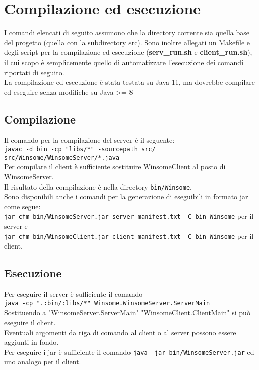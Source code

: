\section{Compilazione ed esecuzione}
I comandi elencati di seguito assumono che la directory corrente sia quella base del progetto
(quella con la subdirectory src). Sono inoltre allegati un Makefile e degli script per la compilazione ed esecuzione (\textbf{serv\_run.sh} e \textbf{client\_run.sh}), il cui scopo è semplicemente quello di automatizzare l'esecuzione dei comandi riportati di seguito.\\
La compilazione ed esecuzione è stata testata su Java 11, ma dovrebbe compilare ed eseguire senza modifiche su Java >= 8

\subsection{Compilazione}
Il comando per la compilazione del server è il seguente:\\
\verb|javac -d bin -cp "libs/*" -sourcepath src/ src/Winsome/WinsomeServer/*.java|\\
Per compilare il client è sufficiente sostituire WinsomeClient al posto di WinsomeServer.\\
Il risultato della compilazione è nella directory \verb|bin/Winsome|.\\

Sono disponibili anche i comandi per la generazione di eseguibili in formato jar come segue:\\
\verb|jar cfm bin/WinsomeServer.jar server-manifest.txt -C bin Winsome| per il server e\\
\verb|jar cfm bin/WinsomeClient.jar client-manifest.txt -C bin Winsome| per il client.
\subsection{Esecuzione}
Per eseguire il server è sufficiente il comando\\
\verb|java -cp ".:bin/:libs/*" Winsome.WinsomeServer.ServerMain|\\
Sostituendo a "WinsomeServer.ServerMain" "WinsomeClient.ClientMain" si può eseguire il client.\\
Eventuali argomenti da riga di comando al client o al server possono essere aggiunti in fondo.\\
Per eseguire i jar è sufficiente il comando \verb|java -jar bin/WinsomeServer.jar| ed uno analogo per il client.
